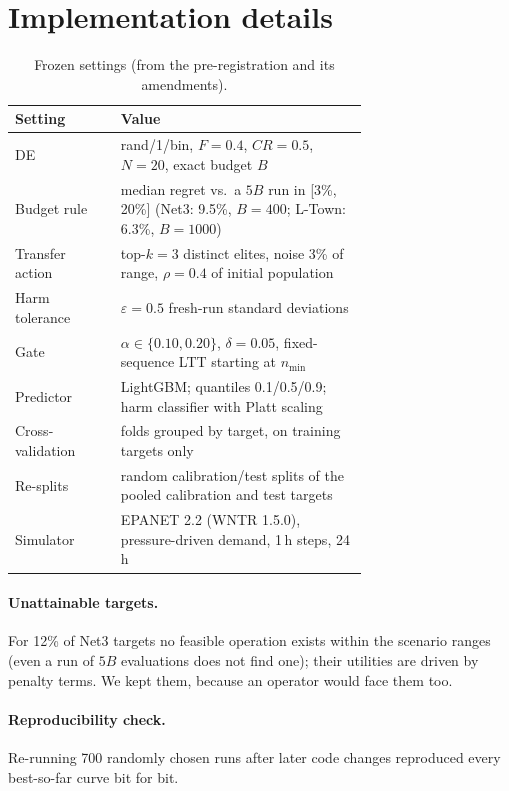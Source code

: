 \documentclass[11pt]{article}
\begin{document}



\appendix
\section{Implementation details}\label{app:details}

\begin{table}[h]
\centering\small
\caption{Frozen settings (from the pre-registration and its amendments).}\label{tab:settings}
\begin{tabular}{@{}l>{\raggedright\arraybackslash}p{0.7\linewidth}@{}}
\toprule
Setting & Value \\
\midrule
DE & rand/1/bin, $F=0.4$, $CR=0.5$, $N=20$, exact budget $B$ \\
Budget rule & median regret vs.\ a $5B$ run in [3\%, 20\%] (Net3: 9.5\%, $B=400$; L-Town: 6.3\%, $B=1000$) \\
Transfer action & top-$k=3$ distinct elites, noise 3\% of range, $\rho=0.4$ of initial population \\
Harm tolerance & $\varepsilon=0.5$ fresh-run standard deviations \\
Gate & $\alpha\in\{0.10, 0.20\}$, $\delta=0.05$, fixed-sequence LTT starting at $n_{\min}$ \\
Predictor & LightGBM; quantiles 0.1/0.5/0.9; harm classifier with Platt scaling \\
Cross-validation & 5 folds grouped by target, on training targets only \\
Re-splits & 200 random calibration/test splits of the pooled calibration and test targets \\
Simulator & EPANET 2.2 (WNTR 1.5.0), pressure-driven demand, 1\,h steps, 24\,h \\
\bottomrule
\end{tabular}
\end{table}

\paragraph{Unattainable targets.} For 12\% of Net3 targets no feasible operation exists within the scenario ranges
(even a run of $5B$ evaluations does not find one); their utilities are driven by penalty terms. We kept them,
because an operator would face them too.

\paragraph{Reproducibility check.} Re-running 700 randomly chosen runs after later code changes reproduced every
best-so-far curve bit for bit.
\end{document}
